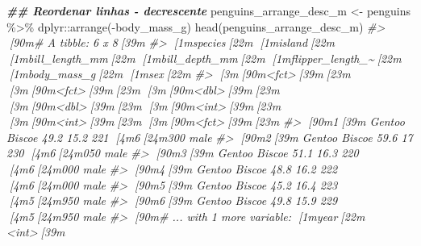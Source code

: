 \documentclass[
]{book}
\newenvironment{Shaded}{\begin{snugshade}}{\end{snugshade}}
\newcommand{\CommentTok}[1]{\textcolor[rgb]{0.37,0.37,0.37}{\textit{#1}}}
\newcommand{\DocumentationTok}[1]{\textcolor[rgb]{0.37,0.37,0.37}{\textbf{\textit{#1}}}}
\newcommand{\FunctionTok}[1]{\textcolor[rgb]{0,0,0}{#1}}
\newcommand{\NormalTok}[1]{#1}
\newcommand{\OtherTok}[1]{\textcolor[rgb]{0.37,0.37,0.37}{#1}}
\newcommand{\SpecialCharTok}[1]{\textcolor[rgb]{0,0,0}{#1}}
\begin{document}
\begin{Shaded}
\begin{Highlighting}[]
\DocumentationTok{\#\# Reordenar linhas {-} decrescente}
\NormalTok{penguins\_arrange\_desc\_m }\OtherTok{\textless{}{-}}\NormalTok{ penguins }\SpecialCharTok{\%\textgreater{}\%} 
\NormalTok{  dplyr}\SpecialCharTok{::}\FunctionTok{arrange}\NormalTok{(}\SpecialCharTok{{-}}\NormalTok{body\_mass\_g)}
\FunctionTok{head}\NormalTok{(penguins\_arrange\_desc\_m)}
\CommentTok{\#\textgreater{} [90m\# A tibble: 6 x 8[39m}
\CommentTok{\#\textgreater{}   [1mspecies[22m [1misland[22m [1mbill\_length\_mm[22m [1mbill\_depth\_mm[22m [1mflipper\_length\_\textasciitilde{}[22m [1mbody\_mass\_g[22m [1msex[22m  }
\CommentTok{\#\textgreater{}   [3m[90m\textless{}fct\textgreater{}[39m[23m   [3m[90m\textless{}fct\textgreater{}[39m[23m           [3m[90m\textless{}dbl\textgreater{}[39m[23m         [3m[90m\textless{}dbl\textgreater{}[39m[23m            [3m[90m\textless{}int\textgreater{}[39m[23m       [3m[90m\textless{}int\textgreater{}[39m[23m [3m[90m\textless{}fct\textgreater{}[39m[23m}
\CommentTok{\#\textgreater{} [90m1[39m Gentoo  Biscoe           49.2          15.2              221        [4m6[24m300 male }
\CommentTok{\#\textgreater{} [90m2[39m Gentoo  Biscoe           59.6          17                230        [4m6[24m050 male }
\CommentTok{\#\textgreater{} [90m3[39m Gentoo  Biscoe           51.1          16.3              220        [4m6[24m000 male }
\CommentTok{\#\textgreater{} [90m4[39m Gentoo  Biscoe           48.8          16.2              222        [4m6[24m000 male }
\CommentTok{\#\textgreater{} [90m5[39m Gentoo  Biscoe           45.2          16.4              223        [4m5[24m950 male }
\CommentTok{\#\textgreater{} [90m6[39m Gentoo  Biscoe           49.8          15.9              229        [4m5[24m950 male }
\CommentTok{\#\textgreater{} [90m\# ... with 1 more variable: [1myear[22m \textless{}int\textgreater{}[39m}


\end{Highlighting}
\end{Shaded}
\end{document}
